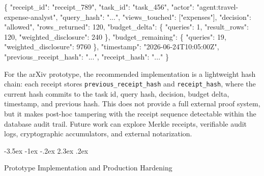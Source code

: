 \documentclass[10pt,twocolumn]{article}
\makeatletter
\newenvironment{Shaded}{}{}
\newcommand{\DataTypeTok}[1]{\textcolor[rgb]{0.56,0.13,0.00}{#1}}
\newcommand{\DecValTok}[1]{\textcolor[rgb]{0.25,0.63,0.44}{#1}}
\newcommand{\FunctionTok}[1]{\textcolor[rgb]{0.02,0.16,0.49}{#1}}
\newcommand{\OtherTok}[1]{\textcolor[rgb]{0.00,0.44,0.13}{#1}}
\newcommand{\StringTok}[1]{\textcolor[rgb]{0.25,0.44,0.63}{#1}}
\renewcommand\section{\@startsection{section}{1}{\z@}%
  {-3.5ex \@plus -1ex \@minus -.2ex}%
  {2.3ex \@plus .2ex}%
  {\normalfont\Large\bfseries\raggedright}}
\makeatother
\begin{document}
\begin{Shaded}
\begin{Highlighting}[]
\FunctionTok{\{}
  \DataTypeTok{"receipt\_id"}\FunctionTok{:} \StringTok{"receipt\_789"}\FunctionTok{,}
  \DataTypeTok{"task\_id"}\FunctionTok{:} \StringTok{"task\_456"}\FunctionTok{,}
  \DataTypeTok{"actor"}\FunctionTok{:} \StringTok{"agent:travel{-}expense{-}analyst"}\FunctionTok{,}
  \DataTypeTok{"query\_hash"}\FunctionTok{:} \StringTok{"..."}\FunctionTok{,}
  \DataTypeTok{"views\_touched"}\FunctionTok{:} \OtherTok{[}\StringTok{"expenses"}\OtherTok{]}\FunctionTok{,}
  \DataTypeTok{"decision"}\FunctionTok{:} \StringTok{"allowed"}\FunctionTok{,}
  \DataTypeTok{"rows\_returned"}\FunctionTok{:} \DecValTok{120}\FunctionTok{,}
  \DataTypeTok{"budget\_delta"}\FunctionTok{:} \FunctionTok{\{}
    \DataTypeTok{"queries"}\FunctionTok{:} \DecValTok{1}\FunctionTok{,}
    \DataTypeTok{"result\_rows"}\FunctionTok{:} \DecValTok{120}\FunctionTok{,}
    \DataTypeTok{"weighted\_disclosure"}\FunctionTok{:} \DecValTok{240}
  \FunctionTok{\},}
  \DataTypeTok{"budget\_remaining"}\FunctionTok{:} \FunctionTok{\{}
    \DataTypeTok{"queries"}\FunctionTok{:} \DecValTok{19}\FunctionTok{,}
    \DataTypeTok{"weighted\_disclosure"}\FunctionTok{:} \DecValTok{9760}
  \FunctionTok{\},}
  \DataTypeTok{"timestamp"}\FunctionTok{:} \StringTok{"2026{-}06{-}24T10:05:00Z"}\FunctionTok{,}
  \DataTypeTok{"previous\_receipt\_hash"}\FunctionTok{:} \StringTok{"..."}\FunctionTok{,}
  \DataTypeTok{"receipt\_hash"}\FunctionTok{:} \StringTok{"..."}
\FunctionTok{\}}
\end{Highlighting}
\end{Shaded}

For the arXiv prototype, the recommended implementation is a lightweight
hash chain: each receipt stores \texttt{previous\_receipt\_hash} and
\texttt{receipt\_hash}, where the current hash commits to the task id,
query hash, decision, budget delta, timestamp, and previous hash. This
does not provide a full external proof system, but it makes post-hoc
tampering with the receipt sequence detectable within the database audit
trail. Future work can explore Merkle receipts, verifiable audit logs,
cryptographic accumulators, and external notarization.


\hypertarget{prototype-implementation-and-production-hardening}{%
\section{Prototype Implementation and Production
Hardening}\label{prototype-implementation-and-production-hardening}}
\end{document}
